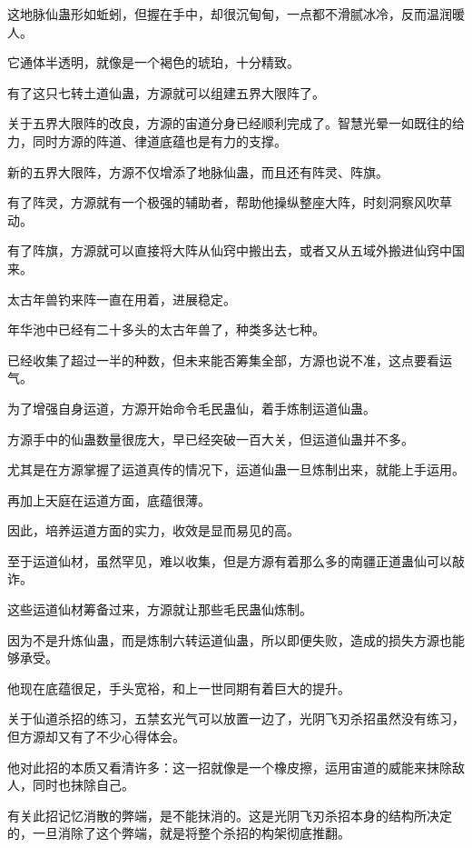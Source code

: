 
\begin{this_body}



这地脉仙蛊形如蚯蚓，但握在手中，却很沉甸甸，一点都不滑腻冰冷，反而温润暖人。

它通体半透明，就像是一个褐色的琥珀，十分精致。

有了这只七转土道仙蛊，方源就可以组建五界大限阵了。

关于五界大限阵的改良，方源的宙道分身已经顺利完成了。智慧光晕一如既往的给力，同时方源的阵道、律道底蕴也是有力的支撑。

新的五界大限阵，方源不仅增添了地脉仙蛊，而且还有阵灵、阵旗。

有了阵灵，方源就有一个极强的辅助者，帮助他操纵整座大阵，时刻洞察风吹草动。

有了阵旗，方源就可以直接将大阵从仙窍中搬出去，或者又从五域外搬进仙窍中国来。

太古年兽钓来阵一直在用着，进展稳定。

年华池中已经有二十多头的太古年兽了，种类多达七种。

已经收集了超过一半的种数，但未来能否筹集全部，方源也说不准，这点要看运气。

为了增强自身运道，方源开始命令毛民蛊仙，着手炼制运道仙蛊。

方源手中的仙蛊数量很庞大，早已经突破一百大关，但运道仙蛊并不多。

尤其是在方源掌握了运道真传的情况下，运道仙蛊一旦炼制出来，就能上手运用。

再加上天庭在运道方面，底蕴很薄。

因此，培养运道方面的实力，收效是显而易见的高。

至于运道仙材，虽然罕见，难以收集，但是方源有着那么多的南疆正道蛊仙可以敲诈。

这些运道仙材筹备过来，方源就让那些毛民蛊仙炼制。

因为不是升炼仙蛊，而是炼制六转运道仙蛊，所以即便失败，造成的损失方源也能够承受。

他现在底蕴很足，手头宽裕，和上一世同期有着巨大的提升。

关于仙道杀招的练习，五禁玄光气可以放置一边了，光阴飞刃杀招虽然没有练习，但方源却又有了不少心得体会。

他对此招的本质又看清许多：这一招就像是一个橡皮擦，运用宙道的威能来抹除敌人，同时也抹除自己。

有关此招记忆消散的弊端，是不能抹消的。这是光阴飞刃杀招本身的结构所决定的，一旦消除了这个弊端，就是将整个杀招的构架彻底推翻。


\end{this_body}
